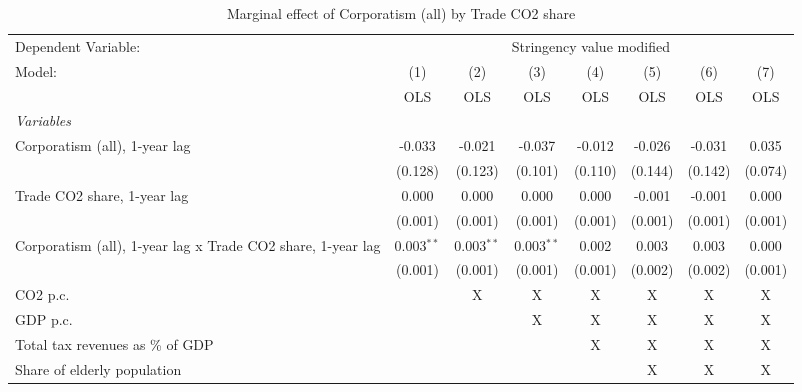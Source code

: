 
\begin{table}[htbp]
   \caption{Marginal effect of Corporatism (all) by Trade CO2 share}
   \centering
   \begin{tabular}{lccccccc}
      \toprule
      Dependent Variable: & \multicolumn{7}{c}{Stringency value modified}\\
      Model:                                                      & (1)          & (2)          & (3)          & (4)     & (5)     & (6)     & (7)\\  
                                                                  &  OLS         & OLS          & OLS          & OLS     & OLS     & OLS     & OLS\\  
      \midrule
      \emph{Variables}\\
      Corporatism (all), 1-year lag                               & -0.033       & -0.021       & -0.037       & -0.012  & -0.026  & -0.031  & 0.035\\   
                                                                  & (0.128)      & (0.123)      & (0.101)      & (0.110) & (0.144) & (0.142) & (0.074)\\   
      Trade CO2 share, 1-year lag                                 & 0.000        & 0.000        & 0.000        & 0.000   & -0.001  & -0.001  & 0.000\\   
                                                                  & (0.001)      & (0.001)      & (0.001)      & (0.001) & (0.001) & (0.001) & (0.001)\\   
      Corporatism (all), 1-year lag x Trade CO2 share, 1-year lag & 0.003$^{**}$ & 0.003$^{**}$ & 0.003$^{**}$ & 0.002   & 0.003   & 0.003   & 0.000\\   
                                                                  & (0.001)      & (0.001)      & (0.001)      & (0.001) & (0.002) & (0.002) & (0.001)\\   
      CO2 p.c.                                                    &              & X            & X            & X       & X       & X       & X\\  
      GDP p.c.                                                    &              &              & X            & X       & X       & X       & X\\  
      Total tax revenues as \% of GDP                             &              &              &              & X       & X       & X       & X\\  
      Share of elderly population                                 &              &              &              &         & X       & X       & X\\  

\end{tabular}
\end{table}

